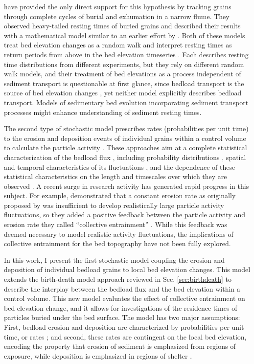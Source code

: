 \citet{Martin2014} have provided the only direct support for this hypothesis by tracking grains through complete cycles of burial and exhumation in a narrow flume.
They observed heavy-tailed resting times of buried grains and described their results with a mathematical model similar to an earlier effort by \citet{Voepel2013}.
Both of these models treat bed elevation changes as a random walk and interpret resting times as return periods from above in the bed elevation timeseries \citep{Redner2007}.
Each describes resting time distributions from different experiments, but they rely on different random walk models, and their treatment of bed elevations as a process independent of sediment transport is questionable at first glance, since bedload transport is the source of bed elevation changes \citep{Wong2007}, yet neither model explicitly describes bedload transport.
Models of sedimentary bed evolution incorporating sediment transport processes might enhance understanding of sediment resting times.

The second type of stochastic model prescribes rates (probabilities per unit time) to the erosion and deposition events of individual grains within a control volume to calculate the particle activity \citep{Einstein1950}.
These approaches aim at a complete statistical characterization of the bedload flux \citep{Furbish2012a,Fathel2015,Furbish2017,Heyman2016}, including probability distributions \citep{Ancey2006,Ancey2008}, spatial and temporal characteristics of its fluctuations \citep{Heyman2014a, Roseberry2012,Dhont2018}, and the dependence of these statistical characteristics on the length and timescales over which they are observed \citep{Singh2009,Singh2012,Saletti2015}.
A recent surge in research activity has generated rapid progress in this subject. 
For example, \citet{Ancey2006} demonstrated that a constant erosion rate as originally proposed by \citet{Einstein1950} was insufficient to develop realistically large particle activity fluctuations, so they added a positive feedback between the particle activity and erosion rate they called ``collective entrainment'' \citep{Ancey2008, Heyman2013,Heyman2014, Lee2018}.
While this feedback was deemed necessary to model realistic activity fluctuations, the implications of collective entrainment for the bed topography have not been fully explored.

In this work, I present the first stochastic model coupling the erosion and deposition of individual bedload grains to local bed elevation changes.
This model extends the birth-death model approach reviewed in Sec. \ref{sec:birthdeath} to describe the interplay between the bedload flux and the bed elevation within a control volume.
This new model evaluates the effect of collective entrainment on bed elevation change, and it allows for investigations of the residence times of particles buried under the bed surface.
The model has two major assumptions: First, bedload erosion and deposition are characterized by probabilities per unit time, or rates \citep{Einstein1950, Ancey2008}; and second, these rates are contingent on the local bed elevation, encoding the property that erosion of sediment is emphasized from regions of exposure, while deposition is emphasized in regions of shelter \citep{Sawai1987, Wong2007}.

